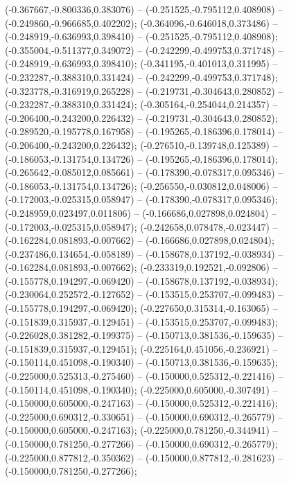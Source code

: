  (-0.367667,-0.800336,0.383076) -- (-0.251525,-0.795112,0.408908) -- (-0.249860,-0.966685,0.402202);
 (-0.364096,-0.646018,0.373486) -- (-0.248919,-0.636993,0.398410) -- (-0.251525,-0.795112,0.408908);
 (-0.355004,-0.511377,0.349072) -- (-0.242299,-0.499753,0.371748) -- (-0.248919,-0.636993,0.398410);
 (-0.341195,-0.401013,0.311995) -- (-0.232287,-0.388310,0.331424) -- (-0.242299,-0.499753,0.371748);
 (-0.323778,-0.316919,0.265228) -- (-0.219731,-0.304643,0.280852) -- (-0.232287,-0.388310,0.331424);
 (-0.305164,-0.254044,0.214357) -- (-0.206400,-0.243200,0.226432) -- (-0.219731,-0.304643,0.280852);
 (-0.289520,-0.195778,0.167958) -- (-0.195265,-0.186396,0.178014) -- (-0.206400,-0.243200,0.226432);
 (-0.276510,-0.139748,0.125389) -- (-0.186053,-0.131754,0.134726) -- (-0.195265,-0.186396,0.178014);
 (-0.265642,-0.085012,0.085661) -- (-0.178390,-0.078317,0.095346) -- (-0.186053,-0.131754,0.134726);
 (-0.256550,-0.030812,0.048006) -- (-0.172003,-0.025315,0.058947) -- (-0.178390,-0.078317,0.095346);
 (-0.248959,0.023497,0.011806) -- (-0.166686,0.027898,0.024804) -- (-0.172003,-0.025315,0.058947);
 (-0.242658,0.078478,-0.023447) -- (-0.162284,0.081893,-0.007662) -- (-0.166686,0.027898,0.024804);
 (-0.237486,0.134654,-0.058189) -- (-0.158678,0.137192,-0.038934) -- (-0.162284,0.081893,-0.007662);
 (-0.233319,0.192521,-0.092806) -- (-0.155778,0.194297,-0.069420) -- (-0.158678,0.137192,-0.038934);
 (-0.230064,0.252572,-0.127652) -- (-0.153515,0.253707,-0.099483) -- (-0.155778,0.194297,-0.069420);
 (-0.227650,0.315314,-0.163065) -- (-0.151839,0.315937,-0.129451) -- (-0.153515,0.253707,-0.099483);
 (-0.226028,0.381282,-0.199375) -- (-0.150713,0.381536,-0.159635) -- (-0.151839,0.315937,-0.129451);
 (-0.225164,0.451056,-0.236921) -- (-0.150114,0.451098,-0.190340) -- (-0.150713,0.381536,-0.159635);
 (-0.225000,0.525313,-0.275460) -- (-0.150000,0.525312,-0.221416) -- (-0.150114,0.451098,-0.190340);
 (-0.225000,0.605000,-0.307491) -- (-0.150000,0.605000,-0.247163) -- (-0.150000,0.525312,-0.221416);
 (-0.225000,0.690312,-0.330651) -- (-0.150000,0.690312,-0.265779) -- (-0.150000,0.605000,-0.247163);
 (-0.225000,0.781250,-0.344941) -- (-0.150000,0.781250,-0.277266) -- (-0.150000,0.690312,-0.265779);
 (-0.225000,0.877812,-0.350362) -- (-0.150000,0.877812,-0.281623) -- (-0.150000,0.781250,-0.277266);
